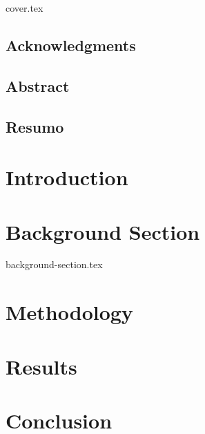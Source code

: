 \documentclass[a4paper, 12pt]{report}
\begin{document}
{cover.tex}

\tableofcontents
\frontmatter
\section*{Acknowledgments}
\newpage
\section*{Abstract}
\newpage
\section*{Resumo}

\mainmatter


\newpage
\chapter{Introduction}

\newpage
\chapter{Background Section}
{background-section.tex}

\newpage
\chapter{Methodology}

\newpage
\chapter{Results}

\newpage
\chapter{Conclusion}

\newpage
\printbibliography
\end{document}
